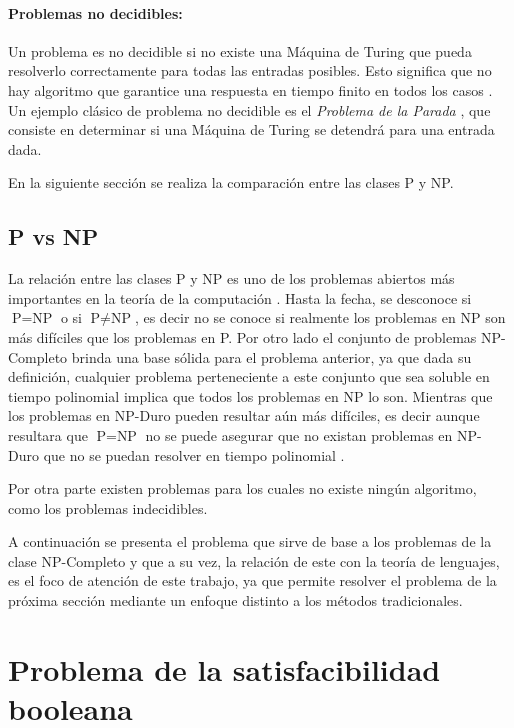 \documentclass[12pt]{article}
\begin{document}
\paragraph{Problemas no decidibles:}
Un problema es no decidible si no existe una Máquina de Turing que pueda resolverlo correctamente para todas las entradas posibles. Esto significa que no hay algoritmo que garantice una respuesta en tiempo finito en todos los casos \cite{authomataTheory}. Un ejemplo clásico de problema no decidible es el \textit{Problema de la Parada} \cite{authomataTheory}, que consiste en determinar si una Máquina de Turing se detendrá para una entrada dada.

En la siguiente sección se realiza la comparación entre las clases P y NP.

\subsection{P vs NP}

La relación entre las clases P y NP es uno de los problemas abiertos más importantes en la teoría de la
computación \cite{authomataTheory}. Hasta la fecha, se desconoce si $\text{P} = \text{NP}$ o si $\text{P} \neq \text{NP}$,
es decir no se conoce si realmente los problemas en NP son más difíciles que los problemas en P. Por otro
lado el conjunto de problemas NP-Completo brinda una base sólida para el problema anterior, ya que dada su
definición, cualquier problema perteneciente a este conjunto que sea soluble en tiempo polinomial
implica que todos los problemas en NP lo son. Mientras que los problemas en NP-Duro pueden resultar aún más
difíciles, es decir aunque resultara que $\text{P} = \text{NP}$ no se puede asegurar que no existan problemas
en NP-Duro que no se puedan resolver en tiempo polinomial \cite{authomataTheory}.

Por otra parte existen problemas para los cuales no existe ningún algoritmo, como los problemas indecidibles.

A continuación se presenta el problema que sirve de base a los problemas de la clase NP-Completo y que a su
vez, la relación de este con la teoría de lenguajes, es el foco de atención de este trabajo, ya que permite 
resolver el problema de la próxima sección mediante un enfoque distinto a los métodos tradicionales.

\section{Problema de la satisfacibilidad booleana}
\end{document}
